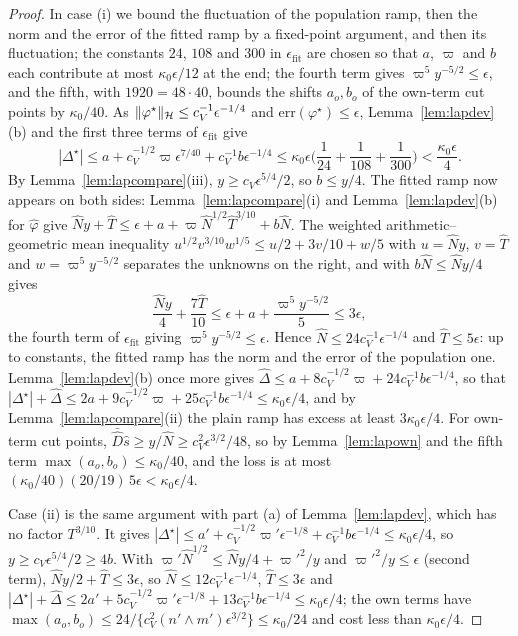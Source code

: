 \begin{proof}
In case (i) we bound the fluctuation of the population ramp, then the norm and the error of the fitted ramp by a
fixed-point argument, and then its fluctuation; the constants $24$, $108$ and $300$ in $\epsilon_{\mathrm{fit}}$ are
chosen so that $a$, $\varpi$ and $b$ each contribute at most $\kappa_0\epsilon/12$ at the end; the fourth term gives $\varpi^5y^{-5/2}\le\epsilon$, and the fifth, with $1920=48\cdot40$, bounds the shifts $a_o,b_o$ of the own-term cut points by $\kappa_0/40$. As
$\|\varphi^\star\|_{\mathcal{H}}\le c_V^{-1}\epsilon^{-1/4}$ and $\mathrm{err}(\varphi^\star)\le\epsilon$, Lemma~\ref{lem:lapdev}(b) and
the first three terms of $\epsilon_{\mathrm{fit}}$ give
\[
|\Delta^\star|\le a+c_V^{-1/2}\varpi\epsilon^{7/40}+c_V^{-1}b\epsilon^{-1/4}\le\kappa_0\epsilon\Big(\frac1{24}+\frac1{108}+\frac1{300}\Big)<\frac{\kappa_0\epsilon}4 .
\]
By Lemma~\ref{lem:lapcompare}(iii), $y\ge c_V\epsilon^{5/4}/2$, so $b\le y/4$. The fitted ramp now appears on both sides:
Lemma~\ref{lem:lapcompare}(i) and Lemma~\ref{lem:lapdev}(b) for $\widehat\varphi$ give
$\widehat Ny+\widehat T\le\epsilon+a+\varpi\widehat N^{1/2}\widehat T^{3/10}+b\widehat N$. The weighted arithmetic--geometric mean inequality $u^{1/2}v^{3/10}w^{1/5}\le u/2+3v/10+w/5$ with $u=\widehat Ny$,
$v=\widehat T$ and $w=\varpi^5y^{-5/2}$ separates the unknowns on the right, and with $b\widehat N\le\widehat Ny/4$ gives
\[
\frac{\widehat Ny}4+\frac{7\widehat T}{10}\le\epsilon+a+\frac{\varpi^5y^{-5/2}}5\le3\epsilon ,
\]
the fourth term of $\epsilon_{\mathrm{fit}}$ giving $\varpi^5y^{-5/2}\le\epsilon$. Hence $\widehat N\le24c_V^{-1}\epsilon^{-1/4}$
and $\widehat T\le5\epsilon$: up to constants, the fitted ramp has the norm and the error of the population one.
Lemma~\ref{lem:lapdev}(b) once more gives $\widehat\Delta\le a+8c_V^{-1/2}\varpi+24c_V^{-1}b\epsilon^{-1/4}$, so that
$|\Delta^\star|+\widehat\Delta\le2a+9c_V^{-1/2}\varpi+25c_V^{-1}b\epsilon^{-1/4}\le\kappa_0\epsilon/4$, and by Lemma~\ref{lem:lapcompare}(ii) the plain ramp has excess at least $3\kappa_0\epsilon/4$. For own-term cut points,
$\bar{\widehat D}\widehat s\ge y/\widehat N\ge c_V^2\epsilon^{3/2}/48$, so by Lemma~\ref{lem:lapown} and the fifth term
$\max(a_o,b_o)\le\kappa_0/40$, and the loss is at most $(\kappa_0/40)(20/19)\,5\epsilon<\kappa_0\epsilon/4$.

Case (ii) is the same argument with part (a) of Lemma~\ref{lem:lapdev}, which has no factor $T^{3/10}$. It gives
$|\Delta^\star|\le a'+c_V^{-1/2}\varpi'\epsilon^{-1/8}+c_V^{-1}b\epsilon^{-1/4}\le\kappa_0\epsilon/4$, so
$y\ge c_V\epsilon^{5/4}/2\ge4b$. With $\varpi'\widehat N^{1/2}\le\widehat Ny/4+\varpi'^2/y$ and $\varpi'^2/y\le\epsilon$
(second term), $\widehat Ny/2+\widehat T\le3\epsilon$, so $\widehat N\le12c_V^{-1}\epsilon^{-1/4}$, $\widehat T\le3\epsilon$ and
$|\Delta^\star|+\widehat\Delta\le2a'+5c_V^{-1/2}\varpi'\epsilon^{-1/8}+13c_V^{-1}b\epsilon^{-1/4}\le\kappa_0\epsilon/4$; the own
terms have $\max(a_o,b_o)\le24/\{c_V^2(n'\wedge m')\epsilon^{3/2}\}\le\kappa_0/24$ and cost less than $\kappa_0\epsilon/4$.
\end{proof}


